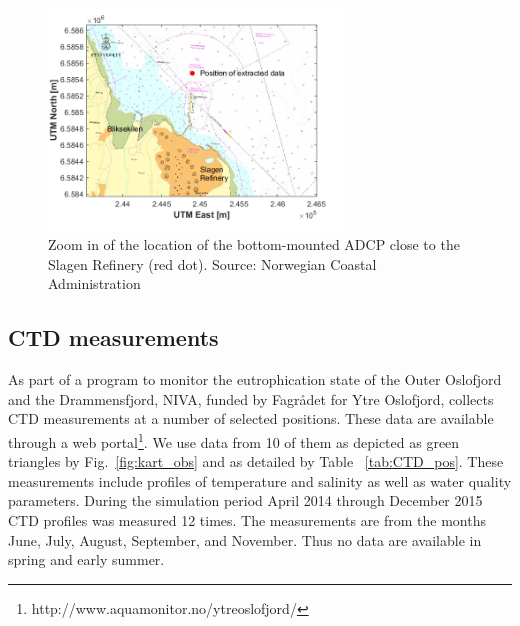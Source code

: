 

\begin{figure}[htb]
\centerline{
\includegraphics*[trim=0cm 0cm 1cm 0cm,clip=true,width=0.7\textwidth]{Figurer/Slagen_kart}}
\caption{\small Zoom in of the location of the bottom-mounted ADCP close to the Slagen Refinery (red dot). Source: Norwegian Coastal Administration}
\label{fig:Slagen-kart}
\end{figure}

\subsection{CTD measurements}
\label{subsec:CTDo}

As part of a program to monitor the eutrophication state of the Outer Oslofjord and the Drammensfjord, NIVA, funded by Fagr{\aa}det for Ytre Oslofjord, collects CTD measurements at a number of selected positions. These data are available through a web portal\footnote{http://www.aquamonitor.no/ytreoslofjord/}. We use data from 10 of them as depicted as green triangles by Fig.~\ref{fig:kart_obs} and as detailed by Table ~\ref{tab:CTD_pos}. These measurements include profiles of temperature and salinity as well as water quality parameters. During the simulation period April 2014 through December 2015 CTD profiles was measured 12 times. The measurements are from the months June, July, August, September, and November. Thus no data are available in spring and early summer. 

